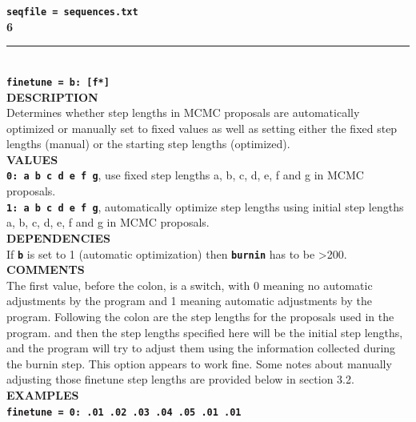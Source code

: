 \documentclass{book}
\numberwithin{equation}{section} \renewcommand{\baselinestretch}{0.55}
\begin{document}
\textbf{\texttt{seqfile = sequences.txt}} \vspace{10pt}\\
\textbf{{\large 6}} \\
\noindent\rule{\textwidth}{0.8pt} \\
\textbf{{\Large \texttt{finetune = b: [f*]}}} \vspace{5pt}\\
\textbf{DESCRIPTION} \vspace{5pt}\\
Determines whether step lengths in MCMC proposals are automatically optimized or manually set to fixed values as well as setting either the fixed step lengths (manual) or the starting step lengths (optimized). \vspace{5pt}\\
\textbf{VALUES} \vspace{5pt}\\
\textbf{\texttt{0: a b c d e f g}}, use fixed step lengths a, b, c, d, e, f and g in MCMC proposals. \vspace{5pt}\\
\textbf{\texttt{1: a b c d e f g}}, automatically optimize step lengths using initial step lengths a, b, c, d, e, f and g in MCMC proposals. \vspace{5pt}\\
\textbf{DEPENDENCIES} \vspace{5pt}\\
If \textbf{\texttt{b}} is set to 1 (automatic optimization) then \textbf{\texttt{burnin}} has to be >200. \vspace{5pt}\\
\textbf{COMMENTS} \vspace{5pt}\\
The first value, before the colon, is a switch, with 0 meaning no
automatic adjustments by the program and 1 meaning automatic
adjustments by the program.  Following the colon are the step lengths
for the proposals used in the program.  and then the step lengths
specified here will be the initial step lengths, and the program will
try to adjust them using the information collected during the burnin
step.  This option appears to work fine.  Some notes about manually
adjusting those finetune step lengths are provided below in section
3.2. \vspace{5pt}\\
\textbf{EXAMPLES} \vspace{5pt}\\
\textbf{\texttt{finetune = 0: .01 .02 .03 .04 .05 .01 .01}} \vspace{5pt}\\
\end{document}
